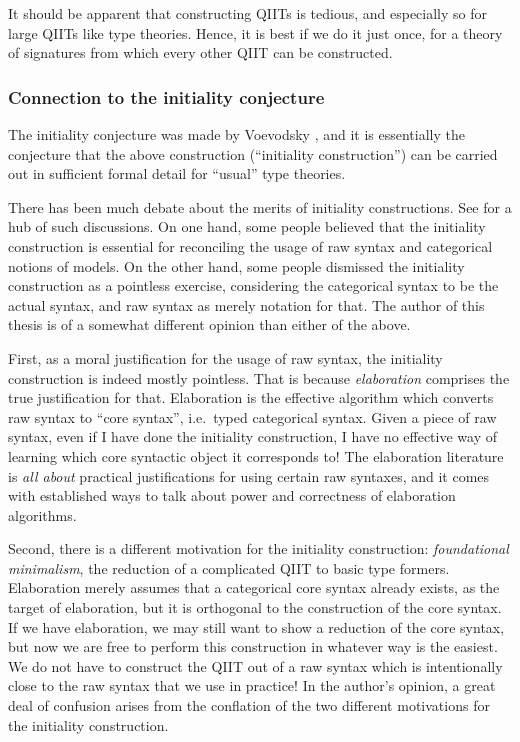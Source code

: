 \documentclass[12pt,a4paper,twoside,openany]{book}
\theoremstyle{remark}
\theoremstyle{definition}
\theoremstyle{theorem}
\begin{document}
It should be apparent that constructing QIITs is tedious, and especially so for
large QIITs like type theories. Hence, it is best if we do it just once, for a
theory of signatures from which every other QIIT can be constructed.

\subsubsection{Connection to the initiality conjecture}

The initiality conjecture was made by Voevodsky \cite{voevodsky-initiality}, and
it is essentially the conjecture that the above construction (``initiality
construction'') can be carried out in sufficient formal detail for ``usual''
type theories.

There has been much debate about the merits of initiality constructions. See
\cite{initiality-project} for a hub of such discussions.  On one hand, some
people believed that the initiality construction is essential for reconciling
the usage of raw syntax and categorical notions of models. On the other hand,
some people dismissed the initiality construction as a pointless exercise,
considering the categorical syntax to be the actual syntax, and raw syntax as
merely notation for that. The author of this thesis is of a somewhat different
opinion than either of the above.

First, as a moral justification for the usage of raw syntax, the initiality
construction is indeed mostly pointless. That is because \emph{elaboration}
comprises the true justification for that. Elaboration is the effective
algorithm which converts raw syntax to ``core syntax'', i.e.\ typed categorical
syntax. Given a piece of raw syntax, even if I have done the initiality
construction, I have no effective way of learning which core syntactic object it
corresponds to!  The elaboration literature is \emph{all about} practical
justifications for using certain raw syntaxes, and it comes with established
ways to talk about power and correctness of elaboration algorithms.

Second, there is a different motivation for the initiality construction:
\emph{foundational minimalism}, the reduction of a complicated QIIT to basic
type formers. Elaboration merely assumes that a categorical core syntax already
exists, as the target of elaboration, but it is orthogonal to the construction of
the core syntax. If we have elaboration, we may still want to show a reduction
of the core syntax, but now we are free to perform this construction in whatever
way is the easiest. We do not have to construct the QIIT out of a raw syntax
which is intentionally close to the raw syntax that we use in practice! In the
author's opinion, a great deal of confusion arises from the conflation of the
two different motivations for the initiality construction.
\end{document}
